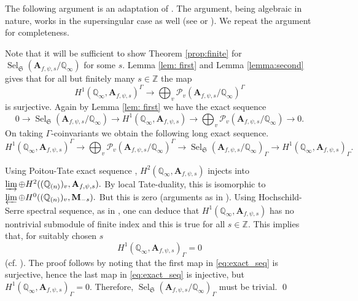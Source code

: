 \documentclass{amsart}
\newcommand{\Q}{\mathbb{Q}}
\newcommand{\Z}{\mathbb{Z}}
\newcommand{\fS}{\mathfrak{S}}
\newcommand{\bA}{\mathbf{A}}
\newcommand{\bM}{\mathbf{M}}
\newcommand{\Sel}{\operatorname{Sel}}
\newtheorem{auxiliary proposition}[theorem]{Auxiliary Proposition}
\newtheorem{main conjecture}[theorem]{Main Conjecture}
\newtheorem{main theorem}[theorem]{Main Theorem}
\newtheorem{modesty proposition}[theorem]{Modesty Proposition}
\newtheorem{open problem}[theorem]{Open Problem}
\newtheorem{convergence lemma}[theorem]{Convergence Lemma}
\newtheorem{corrected lemma}[theorem]{Corrected Lemma}
\newtheorem{growth lemma}[theorem]{Growth Lemma}
\newtheorem{coefficient lemma}[theorem]{Integrality Lemma}
\newtheorem{interpolation lemma}[theorem]{Interpolation Lemma}
\newtheorem{kernel lemma}[theorem]{Kernel Lemma}
\newtheorem{limit lemma}[theorem]{Limit Lemma}
\newtheorem{tandem lemma}[theorem]{Modesty Lemma}
\newtheorem{zero-finding lemma}[theorem]{Zero-Finding Lemma}
\begin{document}
 The following argument is an adaptation of \cite[Proposition 4.14]{Greenberg}. The argument, being algebraic in nature, works in the supersingular case as well (see \cite[Proof of Theorem 2.1 after Remark 2.9]{ponsinet} or \cite[Proof of Theorem 3.1, p. 1276]{HatleyLei19}). We repeat the argument for completeness.

Note that it will be sufficient to show Theorem \ref{prop:finite} for $\Sel_{\fS}(\bA_{f,\psi,s}/\Q_\infty)$ for some $s$.   Lemma \ref{lem: first} and Lemma \ref{lemma:second} gives that for all but finitely many $s \in \Z$ the map 
 $$H^1(\Q_\infty,\bA_{f, \psi,s})^{\Gamma} \rightarrow  \bigoplus_{v}\mathcal{P}_{v}(\bA_{f, \psi,s}/\Q_\infty )^{\Gamma} $$
     is surjective. Again by Lemma \ref{lem: first} we have the exact sequence 
     $$0 \rightarrow \Sel_{\fS}(\bA_{f,\psi,s}/\Q_\infty) \rightarrow H^1(\Q_\infty,\bA_{f, \psi,s}) \rightarrow  \bigoplus_{v}\mathcal{P}_{v}(\bA_{f, \psi,s}/\Q_\infty ) \rightarrow 0. $$
     On taking $\Gamma$-coinvariants we obtain the following long exact sequence.
     \begin{equation}\label{eq:exact_seq}
     H^1(\Q_\infty,\bA_{f, \psi,s})^\Gamma\rightarrow \bigoplus_{v}\mathcal{P}_{v}(\bA_{f, \psi,s}/\Q_\infty )^{\Gamma} \rightarrow \Sel_{\fS}(\bA_{f,\psi,s}/\Q_\infty)_{\Gamma} \rightarrow H^1(\Q_\infty,\bA_{f, \psi,s})_{\Gamma}.
     \end{equation}
    
    Using Poitou-Tate exact sequence \cite[Proposition A.3.2]{PR95}, $H^2(\Q_\infty, \bA_{f,\psi,s})$ injects into $\varinjlim \oplus H^2((\Q_{(n)})_v, \bA_{f,\psi,s}).$ By local Tate-duality, this is isomorphic to $\varprojlim \oplus H^0((\Q_{(n)})_v, \bM_{-s}).$ But this is zero (arguments as in \cite[Corollary 2.8]{HatleyLei19}). Using Hochschild-Serre spectral sequence, as in \cite[Proposition 3.2]{HatleyLei19}, one can deduce that $H^1(\Q_\infty, \bA_{f, \psi, s})$ has no nontrivial submodule of finite index and this is true for all $s\in \Z$. This implies that, for suitably chosen $s$ $$H^1(\Q_\infty,\bA_{f, \psi,s})_{\Gamma}=0$$ (cf. \cite[line -13, page 103]{Greenberg}). The proof follows by noting that the first map in \eqref{eq:exact_seq} is surjective, hence the last map in \eqref{eq:exact_seq} is injective, but $H^1(\Q_\infty,\bA_{f, \psi,s})_{\Gamma}=0$. Therefore, $\Sel_{\fS}(\bA_{f,\psi,s}/\Q_\infty)_{\Gamma}$ must be trivial. \qed
\vspace{.2cm}
\end{document}
